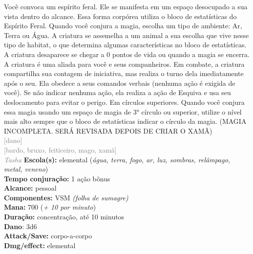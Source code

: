 \documentclass{RPG_Adventure}[2021/10/20]
\begin{document}
{\normalsize Você convoca um espírito feral. Ele se manifesta em um espaço desocupado a sua vista dentro do alcance. Essa forma corpórea utiliza o bloco de estatísticas do Espírito Feral. Quando você conjura a magia, escolha um tipo de ambiente: Ar, Terra ou Água. A criatura se assemelha a um animal a sua escolha que vive nesse tipo de habitat, o que determina algumas características no bloco de estatísticas.  A criatura desaparece se chegar a 0 pontos de vida ou quando a magia se encerra. A criatura é uma aliada para você e seus companheiros.  Em combate, a criatura compartilha sua contagem de iniciativa, mas realiza o turno dela imediatamente após o seu. Ela obedece a seus comandos verbais (nenhuma ação é exigida de você). Se não indicar nenhuma ação, ela realiza a ação de Esquiva e usa seu deslocamento para evitar o perigo.  Em círculos superiores. Quando você conjura essa magia usando um espaço de magia de 3° círculo ou superior, utilize o nível mais alto sempre que o bloco de estatísticas indicar o círculo da magia. (MAGIA INCOMPLETA. SERÁ REVISADA DEPOIS DE CRIAR O XAMÃ)\\}
{\scriptsize \textcolor{gray}{[dano]\\}}
{\scriptsize \textcolor{gray}{[bardo, bruxo, feiticeiro, mago, xamã]\\}}
{\tiny \textcolor{gray}{\textit{Tasha}}}\jump{}
{\small \t \textbf{Escola(s):} elemental (\textit{água, terra, fogo, ar, luz, sombras, relâmpago, metal, veneno})\\\t \textbf{Tempo conjuração:} 1 ação bônus\\\t \textbf{Alcance:} pessoal\\\t \textbf{Componentes:} VSM \textit{(folha de sumagre)}\\\t \textbf{Mana:} 700 (\textit{+ 10 por minuto})\\\t \textbf{Duração:} concentração, até 10 minutos\\\t \textbf{Dano}: 3d6\\\t \textbf{Attack/Save:} corpo-a-corpo\\\t \textbf{Dmg/effect:} elemental\\}
\end{document}
